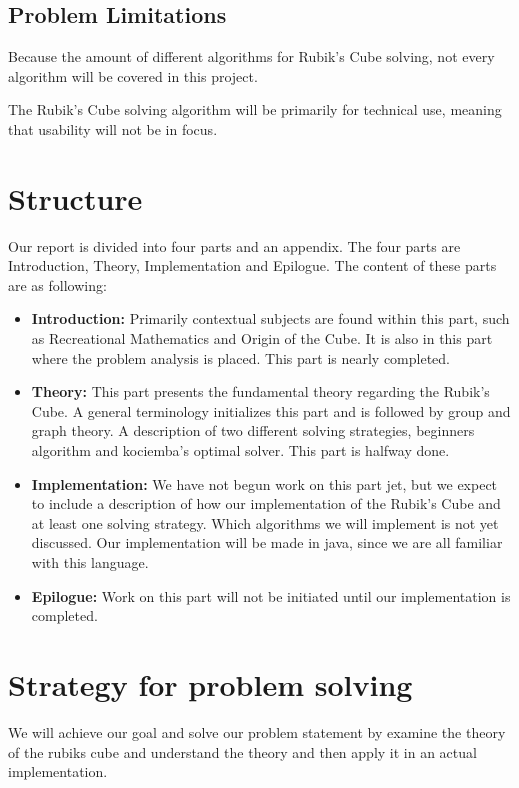 \documentclass{article}
\begin{document}
\subsection{Problem Limitations}
Because the amount of different algorithms for Rubik's Cube solving, not every algorithm will be covered in this project.

The Rubik's Cube solving algorithm will be primarily for technical use, meaning that usability will not be in focus.

\section{Structure}
Our report is divided into four parts and an appendix. The four parts are Introduction, Theory, Implementation and Epilogue.
The content of these parts are as following:
\begin{itemize}
	\item \textbf{Introduction:} Primarily contextual subjects are found within this part, such as Recreational Mathematics and Origin of the Cube. It is also in this part where the problem analysis is placed. This part is nearly completed.
	\item \textbf{Theory:} This part presents the fundamental theory regarding the Rubik's Cube. A general terminology initializes this part and is followed by group and graph theory. A description of two different solving strategies, beginners algorithm and kociemba's optimal solver. This part is halfway done.
	
	\item \textbf{Implementation:} We have not begun work on this part jet, but we expect to include a description of how our implementation of the Rubik's Cube and at least one solving strategy. Which algorithms we will implement is not yet discussed.
	 Our implementation will be made in java, since we are all familiar with this language.
	\item \textbf{Epilogue:} Work on this part will not be initiated until our implementation is completed.
\end{itemize}



\section{Strategy for problem solving}

We will achieve our goal and solve our problem statement by examine the theory of the rubiks cube and understand the theory and then apply it in an actual implementation. 
\end{document}
